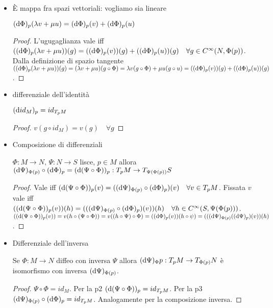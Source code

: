 \begin{itemize}
    \item È mappa fra spazi vettoriali: vogliamo sia lineare
        \begin{prpr}
            $(\dd{\Phi})_{p}(\lambda v +\mu
            u)=(\dd{\Phi})_{p}(v)+(\dd{\Phi})_{p}(u)$
        \end{prpr}
        \begin{proof}
            L'ugugaglianza vale iff $((\dd{\Phi})_{p}(\lambda v +\mu
            u))(g)=((\dd{\Phi})_{p}(v))(g)+((\dd{\Phi})_{p}(u))(g)\quad\forall
            g\in C^\infty(N,\Phi(p))$. Dalla definizione di spazio tangente 
            $((\dd{\Phi})_{p}(\lambda v +\mu u))(g)=(\lambda v +\mu
            u)(g\circ\Phi)=\lambda v(g\circ\Phi)+\mu u(g\circ u)=
            ((\dd{\Phi})_{p}(v))(g)+((\dd{\Phi})_{p}(u))(g)$.
        \end{proof}
        
    \item differenziale dell'identità
        \begin{prpr}
            $(\dd{id_M})_{p}=id_{T_pM}$
        \end{prpr}
        \begin{proof}
            $v(g\circ id_M)=v(g)\quad\forall g$
        \end{proof}

    \item Composizione di differenziali
        \begin{prpr}
            $\Phi:M\rightarrow N,\,\Psi:N\rightarrow S$ lisce,
            $p\in M$ allora $(\dd{\Psi})_{\Phi(p)}\circ(\dd{\Phi})_{p}=
            (\dd{(\Psi\circ\Phi)})_{p}:T_pM\rightarrow
            T_{\Psi(\Phi(p))}S$
        \end{prpr}
        \begin{proof}
            Vale iff $(\dd{(\Psi\circ\Phi)})_{p}(v)=
            ((\dd{\Psi})_{\Phi(p)}\circ(\dd{\Phi})_{p})(v)\quad\forall
            v\in T_pM$. Fissata $v$ vale iff
            $((\dd{(\Psi\circ\Phi)})_{p}(v))(h)=
            (((\dd{\Psi})_{\Phi(p)}\circ(\dd{\Phi})_{p})(v))(h)\quad
            \forall h\in C^\infty(S,\Psi(\Phi(p)))$. 
            $((\dd{(\Psi\circ\Phi)})_{p}(v))=v(h\circ(\Psi\circ\Phi))=
            v((h\circ\Psi)\circ\Phi)=((\dd{\Phi})_{p}(v))(h\circ\psi)= 
            (((\dd{\Psi})_{\Phi(p)}((\dd{\Psi})_{p})(v))(h)$.
        \end{proof}

    \item Differenziale dell'inversa
        \begin{prpr}
            Se $\Phi:M\rightarrow N$ diffeo con inversa $\Psi$
            allora $(\dd{\Psi})_{\Phi}{p}:T_pM\rightarrow T_{\Phi(p)}N$
            è isomorfismo con inversa $(\dd{\Psi})_{\Phi(p)}$. 
        \end{prpr}
        \begin{proof}
            $\Psi\circ\Phi=id_M$. Per la p2
            $(\dd{(\Psi\circ\Phi)})_{p}=id_{T_pM}$. Per la p3
            $(\dd{\Psi})_{\Phi(p)}\circ(\dd{\Phi})_{p}=id_{T_pM}$.
            Analogamente per la composizione inversa.
        \end{proof}

\end{itemize}   

